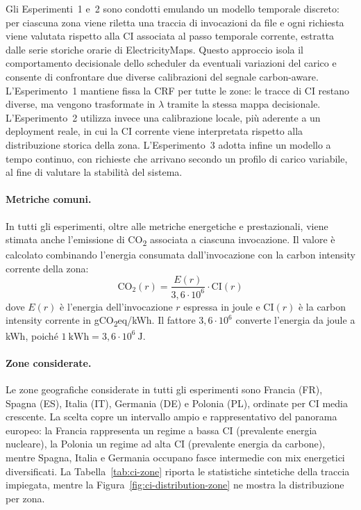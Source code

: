 Gli Esperimenti~1 e~2 sono condotti emulando un modello temporale discreto: per ciascuna zona
viene riletta una traccia di invocazioni da file e ogni richiesta viene
valutata rispetto alla CI associata al passo temporale corrente, estratta
dalle serie storiche orarie di ElectricityMaps.
Questo approccio isola il comportamento decisionale dello scheduler da
eventuali variazioni del carico e consente di confrontare due diverse
calibrazioni del segnale carbon-aware. L'Esperimento~1 mantiene fissa la
CRF per tutte le zone: le tracce di CI restano diverse, ma
vengono trasformate in $\lambda$ tramite la stessa mappa decisionale.
L'Esperimento~2 utilizza invece una calibrazione locale, più aderente a un
deployment reale, in cui la CI corrente viene interpretata rispetto alla
distribuzione storica della zona. L'Esperimento~3 adotta infine un modello
a tempo continuo, con richieste che arrivano secondo un profilo di carico
variabile, al fine di valutare la stabilità del sistema.

\paragraph{Metriche comuni.}
In tutti gli esperimenti, oltre alle metriche energetiche e prestazionali,
viene stimata anche l'emissione di CO\textsubscript{2} associata a ciascuna
invocazione. Il valore è calcolato combinando l'energia consumata
dall'invocazione con la carbon intensity corrente della zona:
%
\begin{equation}
    \mathrm{CO_2}(r) =
        \frac{E(r)}{3{,}6 \cdot 10^6}
        \cdot \mathrm{CI}(r)
    \label{eq:emissioni-invocazione}
\end{equation}
%
dove $E(r)$ è l'energia dell'invocazione $r$ espressa in joule e
$\mathrm{CI}(r)$ è la carbon intensity corrente in
gCO\textsubscript{2}eq/kWh. Il fattore $3{,}6 \cdot 10^6$ converte
l'energia da joule a kWh, poiché $1~\mathrm{kWh}=3{,}6 \cdot 10^6~\mathrm{J}$.

\paragraph{Zone considerate.}
Le zone geografiche considerate in tutti gli esperimenti sono Francia (FR),
Spagna (ES), Italia (IT), Germania (DE) e Polonia (PL), ordinate per CI
media crescente. La scelta copre un intervallo ampio e rappresentativo del
panorama europeo: la Francia rappresenta un regime a bassa CI (prevalente
energia nucleare), la Polonia un regime ad alta CI (prevalente energia da
carbone), mentre Spagna, Italia e Germania occupano fasce intermedie con
mix energetici diversificati. La Tabella~\ref{tab:ci-zone} riporta le
statistiche sintetiche della traccia impiegata, mentre la
Figura~\ref{fig:ci-distribution-zone} ne mostra la distribuzione per zona.

